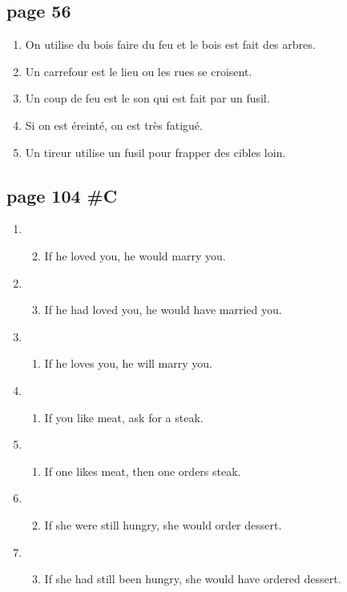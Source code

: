 \documentclass[letterpaper]{article}
\begin{document}
\doublespacing
\subsection*{page 56}
\begin{enumerate}
\item
On utilise du bois faire du feu et le bois est fait des arbres.
\item
Un carrefour est le lieu ou les rues se croisent.
\item
Un coup de feu est le son qui est fait par un fusil.
\item
Si on est éreinté, on est très fatigué.
\item
Un tireur utilise un fusil pour frapper des cibles loin.
\end{enumerate}
\subsection*{page 104 \#C}
\begin{enumerate}
\item
  \begin{enumerate}
  \setcounter{enumii}{1}
  \item
  If he loved you, he would marry you.
  \end{enumerate}
\item
  \begin{enumerate}
  \setcounter{enumii}{2}
  \item
  If he had loved you, he would have married you.
  \end{enumerate}
\item
  \begin{enumerate}
  \setcounter{enumii}{0}
  \item
  If he loves you, he will marry you.
  \end{enumerate}
\item
  \begin{enumerate}
  \setcounter{enumii}{0}
  \item
  If you like meat, ask for a steak.
  \end{enumerate}
\item
  \begin{enumerate}
  \setcounter{enumii}{0}
  \item
  If one likes meat, then one orders steak.
  \end{enumerate}
\item
  \begin{enumerate}
  \setcounter{enumii}{1}
  \item
  If she were still hungry, she would order dessert.
  \end{enumerate}
\item
  \begin{enumerate}
  \setcounter{enumii}{2}
  \item
  If she had still been hungry, she would have ordered dessert.
  \end{enumerate}
\end{enumerate}
\end{document}
